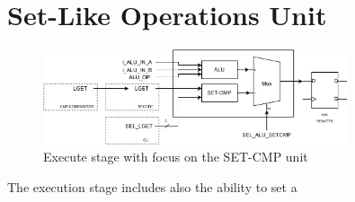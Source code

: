 \section{Set-Like Operations Unit}
\label{section:set_link_operations_unit}

\begin{figure}[ht]
	\centering
	\includegraphics[width=0.8\textwidth]{chapters/5_ExecuteStage/images/set_cmp.pdf}
	\caption{Execute stage with focus on the SET-CMP unit}
	\label{fig:set-cmp}
\end{figure}

The execution stage includes also the ability to set a 